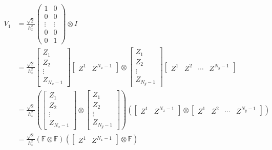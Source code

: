 \documentclass[reqno]{article}
\begin{document}
	\begin{equation}
	\begin{split}
		V_1 &= \frac{\sqrt{2}}{h_x^2}
		\begin{pmatrix}
		1 & 0 \\
		0 & 0 \\
		\vdots & \vdots \\
		0 & 0 \\
		0 & 1
		\end{pmatrix}
		\otimes I \\
		&= \frac{\sqrt{2}}{h_x^2}
		\begin{bmatrix}
			Z_1 \\
			Z_2 \\
			\vdots \\
			Z_{N_x - 1}
		\end{bmatrix}
		\begin{bmatrix}
			Z^1 & Z^{N_x - 1}
		\end{bmatrix}
		\otimes
		\begin{bmatrix}
			Z_1 \\
			Z_2 \\
			\vdots \\
			Z_{N_y - 1}
		\end{bmatrix}
		\begin{bmatrix}
			Z^1 & Z^2 &\cdots & Z^{N_y - 1}
		\end{bmatrix} \\
		&= \frac{\sqrt{2}}{h_x^2}
		\left( 
		\begin{bmatrix}
			Z_1 \\
			Z_2 \\
			\vdots \\
			Z_{N_x - 1}
		\end{bmatrix}
		\otimes\begin{bmatrix}
			Z_1 \\
			Z_2 \\
			\vdots \\
			Z_{N_y - 1}
		\end{bmatrix}
		\right)
		\left(
		\begin{bmatrix}
			Z^1 & Z^{N_x - 1}
		\end{bmatrix}
		\otimes
		\begin{bmatrix}
			Z^1 & Z^2 &\cdots &Z^{N_y - 1}
		\end{bmatrix}
		\right) \\
		&= \frac{\sqrt{2}}{h_x^2}
		\left(\mathbb{F}
		\otimes\mathbb{F}\right)
		\left(
		\begin{bmatrix}
			Z^1 & Z^{N_x - 1}
		\end{bmatrix}
		\otimes \mathbb{F}
		\right)
	\end{split}
	\end{equation}
\end{document}
